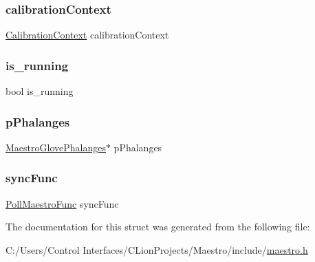 \subsubsection{\texorpdfstring{calibration\+Context}{calibrationContext}}
{\footnotesize\ttfamily \hyperlink{struct_calibration_context}{Calibration\+Context} calibration\+Context}

\mbox{\label{struct_maestro_glove_a95cbd6b99430748422cc048b4f29dc52}} 
\subsubsection{\texorpdfstring{is\+\_\+running}{is\_running}}
{\footnotesize\ttfamily bool is\+\_\+running}

\mbox{\label{struct_maestro_glove_ab47b4ed87837884b7114c36131b3a87b}} 
\subsubsection{\texorpdfstring{p\+Phalanges}{pPhalanges}}
{\footnotesize\ttfamily \hyperlink{struct_maestro_glove_phalanges}{Maestro\+Glove\+Phalanges}$\ast$ p\+Phalanges}

\mbox{\label{struct_maestro_glove_aece1868250475a618a3096b9d6c906d8}} 
\subsubsection{\texorpdfstring{sync\+Func}{syncFunc}}
{\footnotesize\ttfamily \hyperlink{maestro_8h_af5aa626ca28c2c60d6df17f73d397915}{Poll\+Maestro\+Func} sync\+Func}



The documentation for this struct was generated from the following file\+:\begin{DoxyCompactItemize}
\item 
C\+:/\+Users/\+Control Interfaces/\+C\+Lion\+Projects/\+Maestro/include/\hyperlink{maestro_8h}{maestro.\+h}\end{DoxyCompactItemize}
